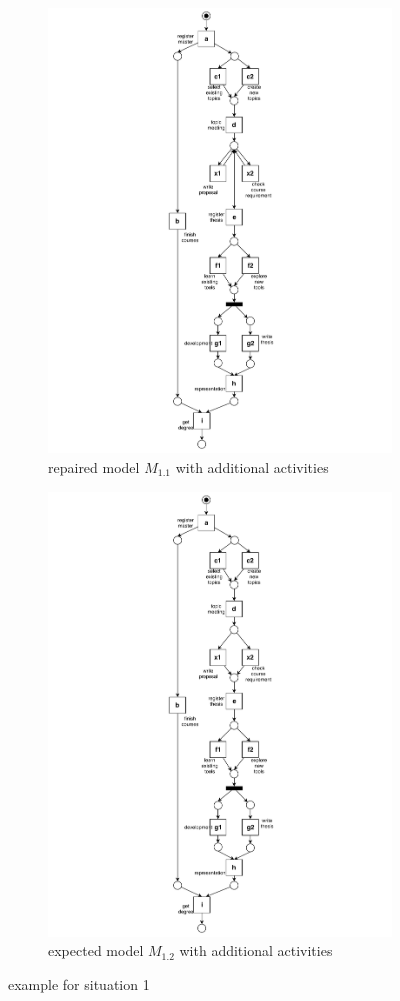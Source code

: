 \begin{figure}[htp]
	\centering
	\begin{subfigure}[b]{0.5\textwidth}
		\centering
		\includegraphics[clip, trim=7cm 0cm 7cm 0cm, width=0.5\linewidth, height=0.7\textheight]{figures/introduction/Master-add-events-loop.pdf}
		\caption{repaired model $M_{1.1}$ with additional activities }
		\label{fig:model_b1}
	\end{subfigure}%
	\begin{subfigure}[b]{0.5\textwidth}
		\centering
		\includegraphics[clip, trim=7cm 0cm 7cm 0cm, width=0.5\linewidth, height=0.7\textheight]{figures/introduction/Master-add-events.pdf}
		\caption{expected model $M_{1.2}$ with additional activities}
		\label{fig:model_b2}
	\end{subfigure}
	\caption{example for situation 1}
	\label{fig:model_change_1}
\end{figure}

